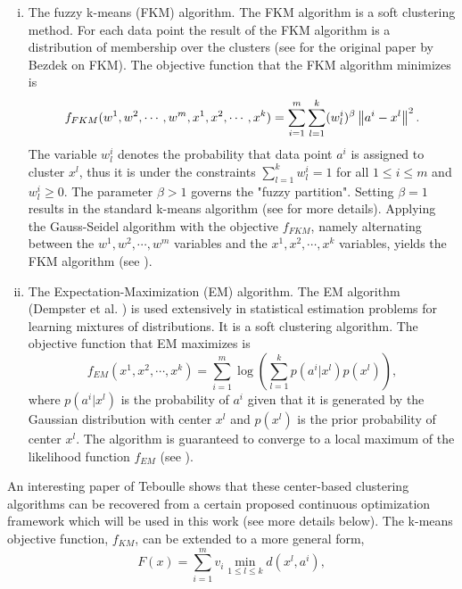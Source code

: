 \begin{enumerate}[(i)]
	\item The fuzzy k-means (FKM) algorithm. The FKM algorithm is a soft clustering method. For each data point the result of the FKM algorithm is a distribution of membership over the clusters (see \cite{B1981} for the original paper by Bezdek on FKM). The objective function that the FKM algorithm minimizes is
	\begin{equation*}
		f_{FKM}(w^1,w^2,\cdots,w^m,x^1,x^2,\cdots,x^k) = \sum\limits_{i=1}^{m}\sum\limits_{l=1}^{k}(w^i_l)^\beta \left\Vert {a^i-x^l} \right\Vert^2.
	\end{equation*}
	The variable $w^i_l$ denotes the probability that data point $a^i$ is assigned to cluster $x^l$, thus it is under the constraints $\sum_{l=1}^{k} w^i_l = 1$ for all $1 \leq i \leq m$ and $w^i_l \geq 0$. The parameter $\beta > 1$ governs the "fuzzy partition". Setting $\beta = 1$ results in the standard k-means algorithm (see  for more details). Applying the Gauss-Seidel algorithm with the objective $f_{FKM}$, namely alternating between the $w^1,w^2,\cdots,w^m$ variables and the $x^1,x^2,\cdots,x^k$ variables, yields the FKM algorithm (see \cite[p. 528]{DHS2001}).
	\item The Expectation-Maximization (EM) algorithm. The EM algorithm (Dempster et al. \cite{DLR1977}) is used extensively in statistical estimation problems for learning mixtures of distributions. It is a soft clustering algorithm. The objective function that EM maximizes is 
	\begin{equation*}
		f_{EM}(x^1,x^2,\cdots,x^k) = \sum\limits_{i=1}^{m} \log \left( \sum\limits_{l=1}^{k} p\left(a^i|x^l\right) p\left(x^l\right) \right),
	\end{equation*}
	where  $p\left(a^i|x^l\right)$ is the probability of $a^i$ given that it is generated by the Gaussian distribution with center $x^l$ and $p\left(x^l\right)$ is the prior probability of center $x^l$. The algorithm is guaranteed to converge to a local maximum of the likelihood function $f_{EM}$ (see \cite{W1983}).
\end{enumerate}
An interesting paper of Teboulle \cite{T2007} shows that these center-based clustering algorithms can be recovered from a certain proposed continuous optimization framework which will be used in this work (see more details below). The k-means objective function, $f_{KM}$, can be extended to a more general form,
	\begin{equation}
		F(x)=\sum\limits_{i=1}^m v_i \min\limits_{1\leq l \leq k} d\left(x^l,a^i\right), \label{clustering_objective}
	\end{equation}
